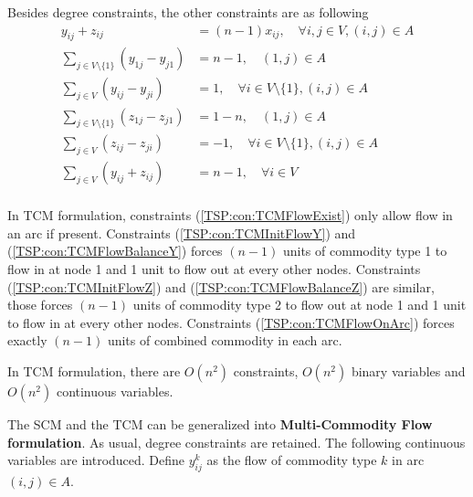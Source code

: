 					Besides degree constraints, the other constraints are as following
					\begin{align}
						y_{ij} + z_{ij} &= (n - 1) x_{ij}, \quad \forall i, j \in V, (i, j) \in A \label{TSP:con:TCMFlowExist} \\
						\sum_{j \in V \setminus \{1\}} (y_{1j} - y_{j1}) &= n - 1, \quad (1, j) \in A \label{TSP:con:TCMInitFlowY}\\
						\sum_{j \in V} (y_{ij} - y_{ji}) & = 1, \quad  \forall i \in V \setminus \{1\}, (i, j) \in A \label{TSP:con:TCMFlowBalanceY}\\
						\sum_{j \in V \setminus \{1\}} (z_{1j} - z_{j1}) &= 1 - n, \quad (1, j) \in A \label{TSP:con:TCMInitFlowZ}\\
						\sum_{j \in V} (z_{ij} - z_{ji}) & = -1, \quad  \forall i \in V \setminus \{1\}, (i, j) \in A \label{TSP:con:TCMFlowBalanceZ}\\
						\sum_{j \in V} (y_{ij} + z_{ij}) &= n - 1, \quad \forall i \in V \label{TSP:con:TCMFlowOnArc}\\
					\end{align}

					In TCM formulation, constraints (\ref{TSP:con:TCMFlowExist}) only allow flow in an arc if present. Constraints (\ref{TSP:con:TCMInitFlowY}) and (\ref{TSP:con:TCMFlowBalanceY}) forces $(n - 1)$ units of commodity type 1 to flow in at node 1 and 1 unit to flow out at every other nodes. Constraints (\ref{TSP:con:TCMInitFlowZ}) and (\ref{TSP:con:TCMFlowBalanceZ}) are similar, those forces $(n - 1)$ units of commodity type 2 to flow out at node 1 and 1 unit to flow in at every other nodes. Constraints (\ref{TSP:con:TCMFlowOnArc}) forces exactly $(n - 1)$ units of combined commodity in each arc.

					In TCM formulation, there are $O(n^2)$ constraints, $O(n^2)$ binary variables and $O(n^2)$ continuous variables.

					The SCM and the TCM can be generalized into \textbf{Multi-Commodity Flow formulation}. As usual, degree constraints are retained. The following continuous variables are introduced. Define $y_{ij}^k$ as the flow of commodity type $k$ in arc $(i, j) \in A$.

